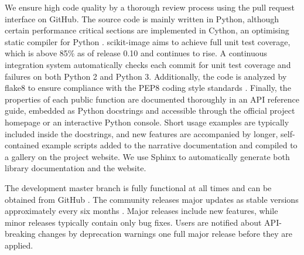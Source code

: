   We ensure high code quality by a thorough review process using the pull request interface on GitHub. The source code is mainly written in Python, although certain performance critical sections are implemented in Cython, an optimising static compiler for Python \citep{Cython}. scikit-image aims to achieve full unit test coverage, which is above 85\% as of release 0.10 and continues to rise. A continuous integration system \citep{TravisCI,Coveralls} automatically checks each commit for unit test coverage and failures on both Python 2 and Python 3. Additionally, the code is analyzed by flake8 \citep{flake8} to ensure compliance with the PEP8 coding style standards \citep{PEP8}. Finally, the properties of each public function are documented thoroughly in an API reference guide, embedded as Python docstrings and accessible through the official project homepage or an interactive Python console. Short usage examples are typically included inside the docstrings, and new features are accompanied by longer, self-contained example scripts added to the narrative documentation and compiled to a gallery on the project website. We use Sphinx \citep{Sphinx} to automatically generate both library documentation and the website.

  The development master branch is fully functional at all times and can be obtained from GitHub \citep{SourceCode}. The community releases major updates as stable versions approximately every six months \citep{Versioning}. Major releases include new features, while minor releases typically contain only bug fixes. Users are notified about API-breaking changes by deprecation warnings one full major release before they are applied.
